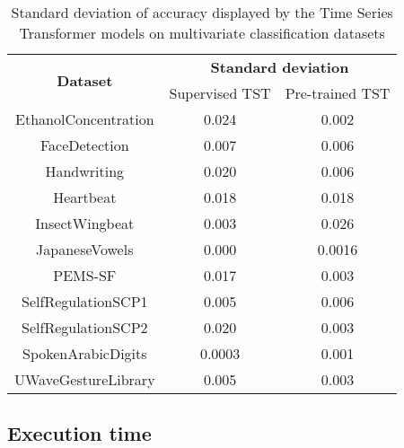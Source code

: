 \documentclass{article} \usepackage{iclr2021_conference,times}
\begin{document}
\begin{table}
\centering

\begin{tabular}{|c|c|c|} 
\hline
\multirow{2}{*}{ \textbf{Dataset}} & \multicolumn{2}{c|}{\textbf{Standard deviation}}  \\ 
\cline{2-3}
                                   & Supervised TST & Pre-trained TST                  \\ 
\hline
EthanolConcentration               & 0.024          & 0.002                            \\
FaceDetection                      & 0.007          & 0.006                              \\
Handwriting                        & 0.020          & 0.006                            \\
Heartbeat                          & 0.018          & 0.018                            \\
InsectWingbeat                     & 0.003          & 0.026                            \\
JapaneseVowels                     & 0.000          & 0.0016                           \\
PEMS-SF                            & 0.017          & 0.003                            \\
SelfRegulationSCP1                 & 0.005          & 0.006                            \\
SelfRegulationSCP2                 & 0.020          & 0.003                            \\
SpokenArabicDigits                 & 0.0003         & 0.001                            \\
UWaveGestureLibrary                & 0.005          & 0.003                            \\
\hline
\end{tabular}
\caption{Standard deviation of accuracy displayed by the Time Series Transformer models on multivariate classification datasets}
\label{tab:std_classification_datasets}
\end{table}








\subsection{Execution time}\label{sec:timing}
\end{document}
